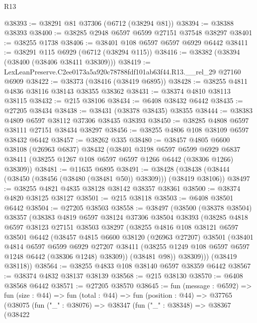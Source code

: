 \begin{lexlean}{R13}
\begin{coremodule}
@38393 := @38291 @81 @37306 (@6712 (@38294 @81))
@38394 := @38388 @38393
@38400 := @38285 @2948 @6597 @6599 @27151 @37548 @38297
@38401 := @38255 @1738
@38406 := @38401 @108 @6597 @6597 @6929 @6442
@38411 := @38291 @115 @6929 (@6712 (@38294 @115))
@38416 := @38382 (@38394 (@38400 (@38406 @38411 @38309)))
@38419 := LexLeanPreserve.C2ee0173a5a920c78788fdf101ab63f44.R13.__rel_29 @27160 @6909
@38422 := @38373 (@38416 (@38419 @6895))
@38428 := @38255 @4811 @4836 @38116 @38143 @38355 @38362
@38431 := @38374 @4810 @38113 @38115
@38432 := @215 @38106
@38434 := @6408 @38432 @6442
@38435 := @27205 @38434
@38438 := @38431 (@38378 @38435) @38355
@38444 := @38383 @4809 @6597 @38112 @37306 @38435 @38393
@38450 := @38285 @4808 @6597 @38111 @27151 @38434 @38297
@38456 := @38255 @4806 @108 @38109 @6597 @38432 @6442
@38457 := @38262 @335
@38480 := @38457
    @4805
    @6600
    @38108
    (@26963 @6837)
    @38432
    (@38401
      @3198
      @6597
      @6599
      @6929
      @6837
      @38411
      (@38255 @1267 @108 @6597 @6597 @1266 @6442 (@38306 @1266) @38309))
@38481 := @11635 @6895
@38491 := @38428 (@38438 (@38444 (@38450 (@38456 (@38480 (@38481 @50)) @38309))) (@38419 @38106))
@38497 := @38255 @4821 @4835 @38128 @38142 @38357 @38361
@38500 := @38374 @4820 @38125 @38127
@38501 := @215 @38118
@38503 := @6408 @38501 @6442
@38504 := @27205 @38503
@38558 := @38497
    (@38500
      (@38378 @38504)
      @38357
      (@38383
        @4819
        @6597
        @38124
        @37306
        @38504
        @38393
        (@38285
          @4818
          @6597
          @38123
          @27151
          @38503
          @38297
          (@38255
            @4816
            @108
            @38121
            @6597
            @38501
            @6442
            (@38457
              @4815
              @6600
              @38120
              (@26963 @27207)
              @38501
              (@38401
                @4814
                @6597
                @6599
                @6929
                @27207
                @38411
                (@38255 @1249 @108 @6597 @6597 @1248 @6442 (@38306 @1248) @38309))
              (@38481 @98))
            @38309)))
      (@38419 @38118))
@38564 := @38255 @4833 @108 @38140 @6597 @38359 @6442
@38567 := @38374 @4832 @38137 @38139
@38568 := @215 @38130
@38570 := @6408 @38568 @6442
@38571 := @27205 @38570
@38645 := fun (message : @6592) =>
  fun (size : @44) =>
  fun (total : @44) =>
  fun (position : @44) =>
  @37765
    (@38075
      (fun ("_" : @38076) =>
      @38347
        (fun ("_" : @38348) =>
        @38367
          (@38422

\end{coremodule}
\end{lexlean}
